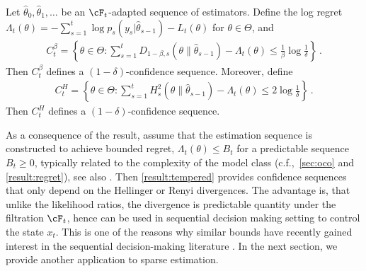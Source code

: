 \begin{theorem}\label{result:tempered} Let $\hat \theta_0, \hat \theta_1, \dots$ be an $\cF_t$-adapted sequence of estimators. Define the log regret $\Lambda_t(\theta) = - \sum_{s=1}^t \log p_s(y_s|\hat \theta_{s-1}) - L_t(\theta)$ for $\theta \in \Theta$, and
    \begin{align*}
        C_t^\beta = \left\{ \theta \in \Theta : \sum_{s=1}^t D_{1-\beta,s}(\theta\|\hat \theta_{s-1}) - \Lambda_t(\theta)\leq \frac{1}{\beta} \log \frac{1}{\delta}\right\} \,.
    \end{align*}
    Then $C_t^\beta$ defines a $(1-\delta)$-confidence sequence. Moreover, define
    \begin{align*}
        C_t^H = \left\{ \theta \in \Theta :\sum_{s=1}^t  H_s^2(\theta\|\hat \theta_{s-1}) - \Lambda_t(\theta)\leq 2 \log \frac{1}{\delta}\right\} \,.
    \end{align*}
    Then $C_t^H$ defines a $(1-\delta)$-confidence sequence.
\end{theorem}
As a consequence of the result, assume that the estimation sequence is constructed to achieve bounded regret, $\Lambda_t(\theta) \leq B_t$ for a predictable sequence $B_t \geq 0$, typically related to the complexity of the model class (c.f.,~\cref{sec:oco} and \cref{result:regret}), see also \citet{zhang2006varepsilon}. Then \cref{result:tempered} provides confidence sequences that only depend on the Hellinger or Renyi divergences. The advantage is, that unlike the likelihood ratios, the divergence is predictable quantity under the filtration $\cF_t$, hence can be used in sequential decision making setting to control the state $x_t$. This is one of the reasons why similar bounds have recently gained interest in the sequential decision-making literature \citep[e.g.,][]{chen2022unified,foster2021statistical,foster2023tight,wagenmaker2023instance}. In the next section, we provide another application to sparse estimation.


